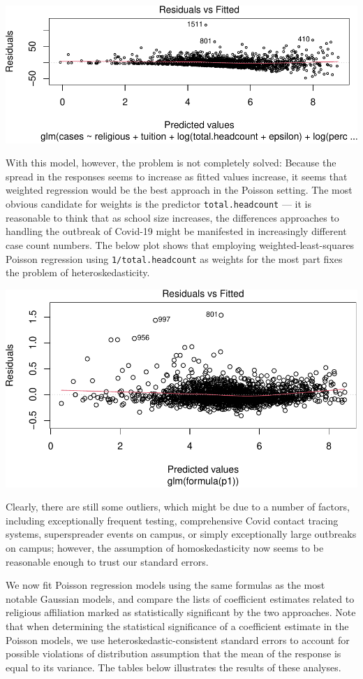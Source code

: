 \documentclass[
]{article}
\begin{document}
\includegraphics{final_files/figure-latex/unnamed-chunk-39-1.pdf}

With this model, however, the problem is not completely solved: Because
the spread in the responses seems to increase as fitted values increase,
it seems that weighted regression would be the best approach in the
Poisson setting. The most obvious candidate for weights is the predictor
\texttt{total.headcount} --- it is reasonable to think that as school
size increases, the differences approaches to handling the outbreak of
Covid-19 might be manifested in increasingly different case count
numbers. The below plot shows that employing weighted-least-squares
Poisson regression using \texttt{1/total.headcount} as weights for the
most part fixes the problem of heteroskedasticity.

\includegraphics{final_files/figure-latex/unnamed-chunk-40-1.pdf}

Clearly, there are still some outliers, which might be due to a number
of factors, including exceptionally frequent testing, comprehensive
Covid contact tracing systems, superspreader events on campus, or simply
exceptionally large outbreaks on campus; however, the assumption of
homoskedasticity now seems to be reasonable enough to trust our standard
errors.

We now fit Poisson regression models using the same formulas as the most
notable Gaussian models, and compare the lists of coefficient estimates
related to religious affiliation marked as statistically significant by
the two approaches. Note that when determining the statistical
significance of a coefficient estimate in the Poisson models, we use
heteroskedastic-consistent standard errors to account for possible
violations of distribution assumption that the mean of the response is
equal to its variance. The tables below illustrates the results of these
analyses.
\end{document}
